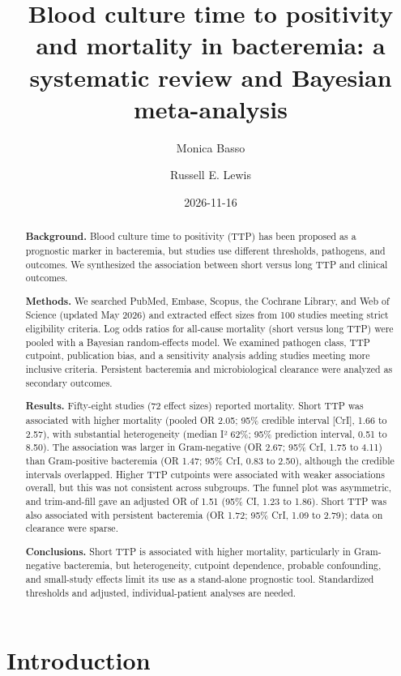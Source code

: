 \documentclass[
  11pt,
]{article}
\title{Blood culture time to positivity and mortality in bacteremia: a
systematic review and Bayesian meta-analysis}
\author{Monica Basso \and Russell E. Lewis}
\date{2026-11-16}
\begin{document}
\maketitle
\begin{abstract}
\textbf{Background.} Blood culture time to positivity (TTP) has been
proposed as a prognostic marker in bacteremia, but studies use different
thresholds, pathogens, and outcomes. We synthesized the association
between short versus long TTP and clinical outcomes.

\textbf{Methods.} We searched PubMed, Embase, Scopus, the Cochrane
Library, and Web of Science (updated May 2026) and extracted effect
sizes from 100 studies meeting strict eligibility criteria. Log odds
ratios for all-cause mortality (short versus long TTP) were pooled with
a Bayesian random-effects model. We examined pathogen class, TTP
cutpoint, publication bias, and a sensitivity analysis adding studies
meeting more inclusive criteria. Persistent bacteremia and
microbiological clearance were analyzed as secondary outcomes.

\textbf{Results.} Fifty-eight studies (72 effect sizes) reported
mortality. Short TTP was associated with higher mortality (pooled OR
2.05; 95\% credible interval {[}CrI{]}, 1.66 to 2.57), with substantial
heterogeneity (median I² 62\%; 95\% prediction interval, 0.51 to 8.50).
The association was larger in Gram-negative (OR 2.67; 95\% CrI, 1.75 to
4.11) than Gram-positive bacteremia (OR 1.47; 95\% CrI, 0.83 to 2.50),
although the credible intervals overlapped. Higher TTP cutpoints were
associated with weaker associations overall, but this was not consistent
across subgroups. The funnel plot was asymmetric, and trim-and-fill gave
an adjusted OR of 1.51 (95\% CI, 1.23 to 1.86). Short TTP was also
associated with persistent bacteremia (OR 1.72; 95\% CrI, 1.09 to 2.79);
data on clearance were sparse.

\textbf{Conclusions.} Short TTP is associated with higher mortality,
particularly in Gram-negative bacteremia, but heterogeneity, cutpoint
dependence, probable confounding, and small-study effects limit its use
as a stand-alone prognostic tool. Standardized thresholds and adjusted,
individual-patient analyses are needed.
\end{abstract}


\section{Introduction}\label{introduction}
\end{document}
